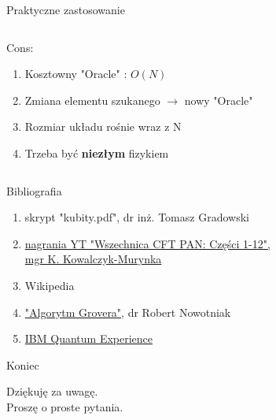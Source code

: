 \documentclass{beamer}
\begin{document}
\begin{frame}{Praktyczne zastosowanie}
\begin{columns}
				\begin{column}{0.5\textwidth}
					\begin{center}
					 	Cons:\\
						\begin{enumerate}
							\item Kosztowny "Oracle" : $O(N)$
							\item Zmiana elementu szukanego $ \longrightarrow $ nowy "Oracle"
							\item Rozmiar układu rośnie wraz z N
							\item Trzeba być \textbf{niezłym} fizykiem
						\end{enumerate}
					\end{center}	
				\end{column}
			\end{columns}
			\vspace{1em}
	\end{frame}
	
	
	
	
	
	\begin{frame}{Bibliografia}
		\begin{block}{}
			\vspace{0.5em}
			\begin{enumerate}
			\item skrypt "kubity.pdf", dr inż. Tomasz Gradowski 
			\item \href{https://www.youtube.com/watch?v=puRu_wEsbAA}{nagrania YT "Wszechnica CFT PAN: Części 1-12",\\ mgr K. Kowalczyk-Murynka}
			\item Wikipedia 
			\item \href{https://robert.nowotniak.com/files/papers/grover.pdf}{"Algorytm Grovera"}, dr Robert Nowotniak
			\item \href{https://quantum-computing.ibm.com/}{IBM Quantum Experience}
			\end{enumerate}
			\vspace{0.5em}
		\end{block}	
	\end{frame}

	\begin{frame}{Koniec}
		\begin{block}{}
			\vspace{0.5em}
			\begin{center}
				Dziękuję za uwagę.\\
				Proszę o {\huge proste} pytania.
			\end{center}
			\vspace{0.5em}
		\end{block}
	\end{frame}
	
\end{document}
